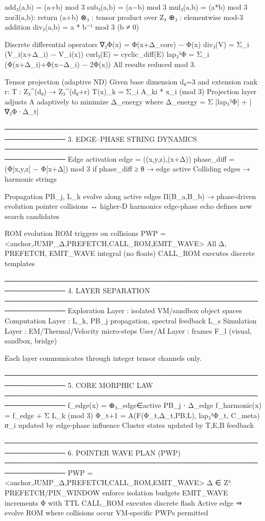     add₃(a,b) = (a+b) mod 3
    sub₃(a,b) = (a−b) mod 3
    mul₃(a,b) = (a*b) mod 3
    xor3(a,b): return (a+b)%
    ⊗₃ : tensor product over Z₃
    ⊕₃ : elementwise mod-3 addition
    div₃(a,b) = a * b⁻¹ mod 3  (b ≠ 0)

Discrete differential operators
    ∇₃Φ(x)   = Φ(x+Δ_core) − Φ(x)
    div₃(V)  = Σ_i (V_i(x+Δ_i) − V_i(x))
    curl₃(E) = cyclic_diff(E)
    lap₃²Φ   = Σ_i (Φ(x+Δ_i)+Φ(x−Δ_i) − 2Φ(x))
All results reduced mod 3.

Tensor projection (adaptive ND)
    Given base dimension d₀=3 and extension rank r:
        T : Z₃^(d₀) → Z₃^(d₀+r)
        T(x)_k = Σ_i A_ki * x_i  (mod 3)
    Projection layer adjusts A adaptively to minimize Δ_energy
    where Δ_energy = Σ |lap₃²Φ| + |∇₃Φ·Δ_t|

──────────────────────────────────────────────────────────────
3. EDGE–PHASE STRING DYNAMICS
──────────────────────────────────────────────────────────────
Edge activation
    edge = ((x,y,z),(x+Δ))
    phase_diff = (Φ[x,y,z] − Φ[x+Δ]) mod 3
    if phase_diff ≥ θ → edge active
    Colliding edges → harmonic strings

Propagation
    PB_j, L_k evolve along active edges
    Π(B_a,B_b) → phase-driven evolution
    pointer collisions ↔ higher-D harmonics
    edge-phase echo defines new search candidates

ROM evolution
    ROM triggers on collisions
    PWP = <anchor,{JUMP_Δ,PREFETCH,CALL_ROM,EMIT_WAVE}>
    All Δ, PREFETCH, EMIT_WAVE integral (no floats)
    CALL_ROM executes discrete templates

──────────────────────────────────────────────────────────────
4. LAYER SEPARATION
──────────────────────────────────────────────────────────────
Exploration Layer : isolated VM/sandbox object spaces
Computation Layer : L_k, PB_j propagation, spectral feedback L_s
Simulation Layer  : EM/Thermal/Velocity micro-steps
User/AI Layer     : frames F_l  (visual, sandbox, bridge)

Each layer communicates through integer tensor channels only.

──────────────────────────────────────────────────────────────
5. CORE MORPHIC LAW
──────────────────────────────────────────────────────────────
f_edge(x)     = ⊕₃_{edge∈active} PB_j ⋅ Δ_edge
f_harmonic(x) = f_edge + Σ L_k  (mod 3)
Φ_{t+1}       = A(F(Φ_t,Δ_t,PB,L), lap₃²Φ_t, C_meta)
σ_i updated by edge-phase influence
Cluster states updated by T,E,B feedback

──────────────────────────────────────────────────────────────
6. POINTER WAVE PLAN (PWP)
──────────────────────────────────────────────────────────────
PWP = <anchor,{JUMP_Δ,PREFETCH,CALL_ROM,EMIT_WAVE}>
Δ ∈ Z³
PREFETCH/PIN_WINDOW enforce isolation budgets
EMIT_WAVE increments Φ with TTL
CALL_ROM executes discrete flash
Active edge ⇒ evolve ROM where collisions occur
VM-specific PWPs permitted

